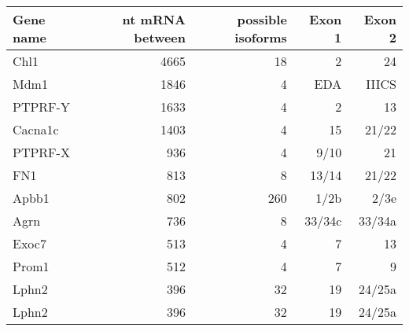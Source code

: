 \small
\begin{tabular}{   | l                        | r                          | r               | r                         |r|}


\textbf{Gene name} & \textbf{nt mRNA between} & \textbf{possible isoforms} & \textbf{Exon 1} & \textbf{Exon 2} \\ \hline 
Chl1               & 4665                     & 18                         & 2               & 24              \\ \hline 
Mdm1               & 1846                     & 4                          & EDA             & IIICS           \\ \hline 
PTPRF-Y            & 1633                     & 4                          & 2               & 13              \\ \hline 
Cacna1c            & 1403                     & 4                          & 15              & 21/22           \\ \hline 
PTPRF-X            & 936                      & 4                          & 9/10            & 21              \\ \hline 
FN1                & 813                      & 8                          & 13/14           & 21/22           \\ \hline 
Apbb1              & 802                      & 260                        & 1/2b            & 2/3e            \\ \hline 
Agrn               & 736                      & 8                          & 33/34c          & 33/34a          \\ \hline 
Exoc7              & 513                      & 4                          & 7               & 13              \\ \hline 
Prom1              & 512                      & 4                          & 7               & 9               \\ \hline 
Lphn2              & 396                      & 32                         & 19              & 24/25a          \\ \hline 
  Lphn2              & 396                               & 32                         & 19              & 24/25a          \\ \hline
  \end{tabular}

